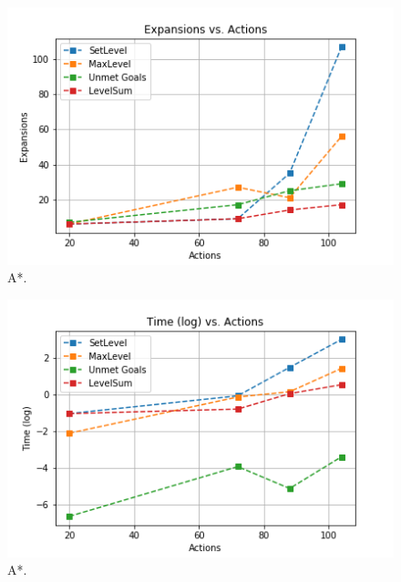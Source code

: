 \documentclass[a4paper]{article}
\begin{document}
\begin{figure}[htpb]
\begin{center}
\includegraphics[width=1\columnwidth]{fig/results_034.png}
\caption{A*.}
\end{center}
\label{fig034}
\end{figure}
        


\begin{figure}[htpb]
\begin{center}
\includegraphics[width=1\columnwidth]{fig/results_031.png}
\caption{A*.}
\end{center}
\label{fig031}
\end{figure}
        
\end{document}
